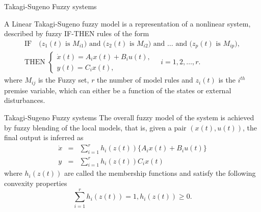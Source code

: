 \begin{frame}{Takagi-Sugeno Fuzzy systems}
    \begin{definition} A Linear Takagi-Sugeno  fuzzy model \autocite{Tanaka2001} is a representation of a nonlinear system, described by fuzzy IF-THEN rules of the form
\begin{equation} \label{tsfuzzysys}
\begin{array}{l}
\mbox{IF ~ } \big(z_1(t)\mbox{~is~} M_{i1}\big) \mbox{~and~} \big(z_2(t)\mbox{~is~} M_{i2}\big)\mbox{~and~} \ldots \mbox{~and~}\big(z_p(t) \mbox{~is~} M_{ip}\big
),\\[1mm]
\mbox{THEN~}
\left\{\begin{array}{l}
\dot{x}(t)={A}_i{x}(t) + B_iu(t),\\
y(t)={C}_i{x}(t),
\end{array} \right. \quad i=1,2,\ldots, r.
\end{array}    
\end{equation}
where $M_{ij}$ is the Fuzzy set, $r$ the number of model rules and $z_i(t)$ is the $i^{th}$ premise variable, which can either be a function of the states or external disturbances. 
\end{definition}
\end{frame}

\begin{frame}{Takagi-Sugeno Fuzzy systems}
    The overall fuzzy model of the system is achieved by fuzzy blending of the local models, that is, given a pair $(x(t),u(t))$, the final output is inferred as
\begin{eqnarray} \label{tsfuzzyblend}
    \dot{x} &=& \displaystyle  \sum_{i=1}^{r}h_i(z(t))\{A_ix(t)+B_iu(t)\}\\
y&=& \displaystyle  \sum_{i=1}^{r}h_i(z(t))C_ix(t)
\end{eqnarray}
where $h_i(z(t))$ are called the membership functions and satisfy the following convexity properties
\begin{equation}
    \displaystyle\sum_{i=1}^{r}h_i(z(t)) = 1, \displaystyle h_i(z(t)) \geq 0.
\end{equation}
\end{frame}

